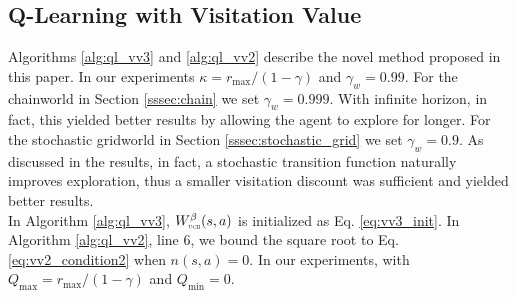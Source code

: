 \documentclass{article}
\newcommand{\textsub}[1]{\textsc{\tiny #1}} \newcommand{\func}[2]{\textsf{#1}(#2)} \newcommand{\hl}[1]{\textcolor{red}{{#1}}} \newcommand{\hll}[1]{\textcolor{blue}{{#1}}}
\newcommand{\coeff}{\kappa}
\begin{document}
\subsection{Q-Learning with Visitation Value}
Algorithms \ref{alg:ql_vv3} and \ref{alg:ql_vv2} describe the novel method proposed in this paper. In our experiments $\coeff = r_{\max} / (1 - \gamma)$ and $\gamma_w = 0.99$. For the chainworld in Section \ref{sssec:chain} we set $\gamma_w = 0.999$. With infinite horizon, in fact, this yielded better results by allowing the agent to explore for longer. For the stochastic gridworld in Section \ref{sssec:stochastic_grid} we set $\gamma_w = 0.9$. As discussed in the results, in fact, a stochastic transition function naturally improves exploration, thus a smaller visitation discount was sufficient and yielded better results.
\\
In Algorithm \ref{alg:ql_vv3}, $W^\beta_{\textsub{ucb}}(s,a)$ is initialized as Eq. \eqref{eq:vv3_init}. In Algorithm \ref{alg:ql_vv2}, line 6, we bound the square root to Eq. \eqref{eq:vv2_condition2} when $n(s,a) = 0$. In our experiments, with $Q_{\max} = r_{\max} / (1 - \gamma)$ and $Q_{\min} = 0$.
\end{document}
